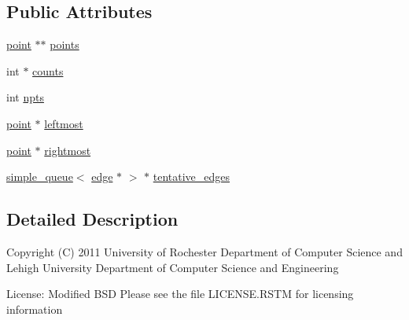 \subsection*{Public Attributes}
\begin{DoxyCompactItemize}
\item 
\hyperlink{classpoint}{point} $\ast$$\ast$ \hyperlink{structregion__info_a6a51b82586ad9e05d79a0af19d757c70}{points}
\item 
int $\ast$ \hyperlink{structregion__info_af4ed1f6cecbf7c31f1b849bd1cf68f63}{counts}
\item 
int \hyperlink{structregion__info_a1e35c9ccb01bd99b55d24aa6829d19d9}{npts}
\item 
\hyperlink{classpoint}{point} $\ast$ \hyperlink{structregion__info_a95f5424c3d201a98ca861fe07b85b803}{leftmost}
\item 
\hyperlink{classpoint}{point} $\ast$ \hyperlink{structregion__info_a323986dad7805accde6cfb51fcaee905}{rightmost}
\item 
\hyperlink{classsimple__queue}{simple\-\_\-queue}$<$ \hyperlink{classedge}{edge} $\ast$ $>$ $\ast$ \hyperlink{structregion__info_a9d8a6202258ed7ad229e753a2bd52c6f}{tentative\-\_\-edges}
\end{DoxyCompactItemize}


\subsection{Detailed Description}
Copyright (C) 2011 University of Rochester Department of Computer Science and Lehigh University Department of Computer Science and Engineering

License\-: Modified B\-S\-D Please see the file L\-I\-C\-E\-N\-S\-E.\-R\-S\-T\-M for licensing information 

